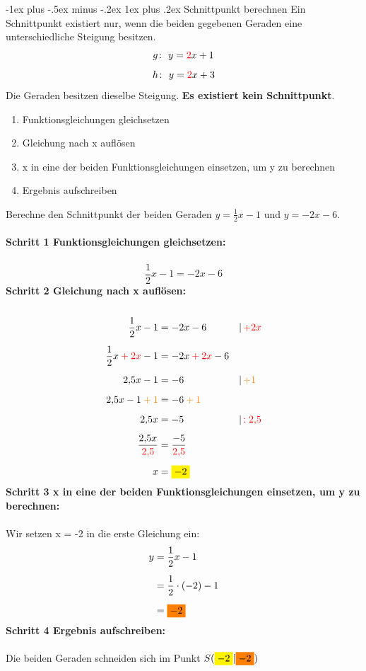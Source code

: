 \documentclass[a4paper,10pt]{article}
\makeatletter
\renewcommand{\subsubsection}{\@startsection{subsubsection}{3}{0mm}%
                                {-1ex plus -.5ex minus -.2ex}%
                                {1ex plus .2ex}%
                                {\normalfont\small\bfseries}}
\makeatother
\begin{document}
\begin{multicols}{3}
    \subsubsection{Schnittpunkt berechnen}
    Ein Schnittpunkt existiert nur, wenn die beiden gegebenen Geraden eine unterschiedliche Steigung besitzen.
    \[g\colon~y = {\color{red}2}x + 1\]
    \[h\colon~y = {\color{red}2}x + 3\]
    Die Geraden besitzen dieselbe Steigung. \textbf{Es existiert kein Schnittpunkt}.
    \begin{enumerate}
        \item Funktionsgleichungen gleichsetzen
        \item Gleichung nach x auflösen
        \item x in eine der beiden Funktionsgleichungen einsetzen, um y zu berechnen
        \item Ergebnis aufschreiben
    \end{enumerate}
    Berechne den Schnittpunkt der beiden Geraden $y = \frac{1}{2}x - 1$ und $y = -2x - 6$.\\~\\
    \textbf{Schritt 1 Funktionsgleichungen gleichsetzen:}\\~\\
    \[\frac{1}{2}x - 1 = -2x - 6\]
    \textbf{Schritt 2 Gleichung nach x auflösen:}\\~\\
    \begin{align*} \frac{1}{2}x - 1 &= -2x - 6 &&|\, {\color{red}+2x} \\[5px] \frac{1}{2}x {\color{red}\: + \: 2x} - 1 &= -2x {\color{red}\: + \: 2x} - 6 \\[5px] 2{,}5x - 1 &= - 6 &&|\, {\color{orange}+1} \\[5px] 2{,}5x - 1 {\color{orange}\: + \: 1} &= - 6 {\color{orange}\: + \: 1} \\[5px] 2{,}5x &= -5 &&|\, {\color{red}:2{,}5} \\[5px] \frac{2{,}5x}{{\color{red}2{,}5}} &= \frac{-5}{{\color{red}2{,}5}} \\[5px] x &= {\colorbox{yellow}{$-2$}} \end{align*}
    \textbf{Schritt 3 x in eine der beiden Funktionsgleichungen einsetzen, um y zu berechnen:}\\~\\
    Wir setzen x = -2 in die erste Gleichung ein:
    \begin{align*} y &= \frac{1}{2}x - 1 \\[5px] &= \frac{1}{2} \cdot (-2) - 1 \\[5px] &= {\colorbox{orange}{$-2$}} \end{align*}
    \textbf{Schritt 4 Ergebnis aufschreiben:}\\~\\
    Die beiden Geraden schneiden sich im Punkt $S({\colorbox{yellow}{$-2$}}|{\colorbox{orange}{$-2$}})$

\end{multicols}
\end{document}
